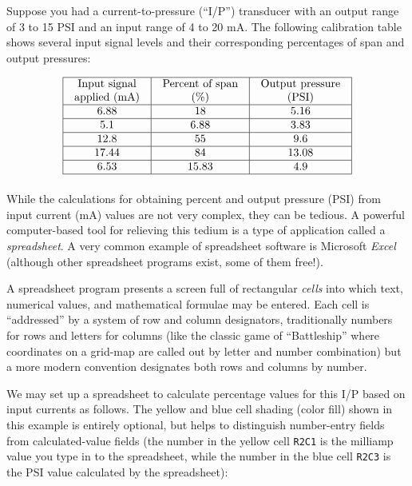 

Suppose you had a current-to-pressure (``I/P'') transducer with an output range of 3 to 15 PSI and an input range of 4 to 20 mA.  The following calibration table shows several input signal levels and their corresponding percentages of span and output pressures:


$$\vbox{\offinterlineskip
\halign{\strut
\vrule \quad\hfil # \ \hfil & 
\vrule \quad\hfil # \ \hfil & 
\vrule \quad\hfil # \ \hfil \vrule \cr
\noalign{\hrule}
%
Input signal & Percent of span & Output pressure \cr
%
applied (mA) & (\%) & (PSI) \cr
%
\noalign{\hrule}
%
6.88 & 18 & 5.16 \cr
%
\noalign{\hrule}
%
5.1 & 6.88 & 3.83 \cr
%
\noalign{\hrule}
%
12.8 & 55 & 9.6 \cr
%
\noalign{\hrule}
%
17.44 & 84 & 13.08 \cr
%
\noalign{\hrule}
%
6.53 & 15.83 & 4.9 \cr
%
\noalign{\hrule}
} %
}$$ %

While the calculations for obtaining percent and output pressure (PSI) from input current (mA) values are not very complex, they can be tedious.  A powerful computer-based tool for relieving this tedium is a type of application called a {\it spreadsheet}.  A very common example of spreadsheet software is Microsoft {\it Excel} (although other spreadsheet programs exist, some of them free!).

A spreadsheet program presents a screen full of rectangular {\it cells} into which text, numerical values, and mathematical formulae may be entered.  Each cell is ``addressed'' by a system of row and column designators, traditionally numbers for rows and letters for columns (like the classic game of ``Battleship'' where coordinates on a grid-map are called out by letter and number combination) but a more modern convention designates both rows and columns by number.

We may set up a spreadsheet to calculate percentage values for this I/P based on input currents as follows.  The yellow and blue cell shading (color fill) shown in this example is entirely optional, but helps to distinguish number-entry fields from calculated-value fields (the number in the yellow cell {\tt R2C1} is the milliamp value you type in to the spreadsheet, while the number in the blue cell {\tt R2C3} is the PSI value calculated by the spreadsheet):

